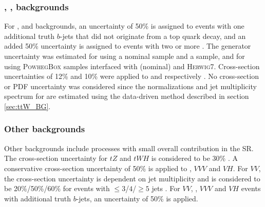 \documentclass[../thesis.tex]{subfiles}
\begin{document}
\subsubsection*{\ttW, \ttZ, \ttH backgrounds}
For \ttW, \ttZ and \ttH backgrounds, an uncertainty of 50\% is assigned to events with one additional truth $b$-jets that did not originate from a top quark decay, and an added 50\% uncertainty is assigned to events with two or more \citep{TOPQ-2017-12}. The generator uncertainty was estimated for \ttZ using a \mgamc nominal sample and a \sherpa sample, and for \ttH using \textsc{PowhegBox} samples interfaced with \pythia (nominal) and \textsc{Herwig7}. Cross-section uncertainties of 12\% and 10\% were applied to \ttZ and \ttH respectively \citep{deFlorian:2016spz}. No \ttW cross-section or \acs{PDF} uncertainty was considered since the normalizations and jet multiplicity spectrum for \ttW are estimated using the data-driven method described in section \ref{sec:ttW_BG}.

\subsubsection*{Other backgrounds}
Other backgrounds include processes with small overall contribution in the \acs{SR}. The cross-section uncertainty for $tZ$ and $tWH$ is considered to be 30\% \citep{ATLAS-CONF-2017-052,Demartin_2017}. A conservative cross-section uncertainty of 50\% is applied to \ttVV, $VVV$ and $VH$. For $VV$, the cross-section uncertainty is dependent on jet multiplicity and is considered to be 20\%/50\%/60\% for events with $\leq 3$/$4$/$\geq 5$ jets \citep{STDM-2018-03}. For $VV$, \ttVV, $VVV$ and $VH$ events with additional truth $b$-jets, an uncertainty of 50\% is applied.
\end{document}
